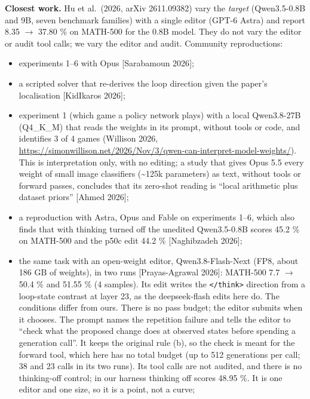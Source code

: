 \documentclass[
  10pt,
]{article}
\newcommand{\passthrough}[1]{#1}
\providecommand{\tightlist}{%
  \setlength{\itemsep}{0pt}\setlength{\parskip}{0pt}}
\begin{document}
\textbf{Closest work.} Hu et al.~(2026, arXiv 2611.09382) vary the
\emph{target} (Qwen3.5-0.8B and 9B, seven benchmark families) with a
single editor (GPT-6 Astra) and report 8.35 \ensuremath{\rightarrow} 37.80 \% on MATH-500 for
the 0.8B model. They do not vary the editor or audit tool calls; we vary
the editor and audit. Community reproductions:

\begin{itemize}
\tightlist
\item
  experiments 1--6 with Opus {[}Sarabamoun 2026{]};
\item
  a scripted solver that re-derives the loop direction given the paper's
  localisation {[}KidIkaros 2026{]};
\item
  experiment 1 (which game a policy network plays) with a local
  Qwen3.8-27B (Q4\_K\_M) that reads the weights in its prompt, without
  tools or code, and identifies 3 of 4 games (Willison 2026,
  \url{https://simonwillison.net/2026/Nov/3/qwen-can-interpret-model-weights/}).
  This is interpretation only, with no editing; a study that gives Opus
  5.5 every weight of small image classifiers (\textasciitilde125k
  parameters) as text, without tools or forward passes, concludes that
  its zero-shot reading is ``local arithmetic plus dataset priors''
  {[}Ahmed 2026{]};
\item
  a reproduction with Astra, Opus and Fable on experiments 1--6, which
  also finds that with thinking turned off the unedited Qwen3.5-0.8B
  scores 45.2 \% on MATH-500 and the p50c edit 44.2 \% {[}Naghibzadeh
  2026{]};
\item
  the same task with an open-weight editor, Qwen3.8-Flash-Next (FP8,
  about 186 GB of weights), in two runs {[}Prayas-Agrawal 2026{]}:
  MATH-500 7.7 \ensuremath{\rightarrow} 50.4 \% and 51.55 \% (4 samples). Its edit writes the
  \passthrough{\lstinline!</think>!} direction from a loop-state
  contrast at layer 23, as the deepseek-flash edits here do. The
  conditions differ from ours. There is no pass budget; the editor
  submits when it chooses. The prompt names the repetition failure and
  tells the editor to ``check what the proposed change does at observed
  states before spending a generation call''. It keeps the original rule
  (b), so the check is meant for the forward tool, which here has no
  total budget (up to 512 generations per call; 38 and 23 calls in its
  two runs). Its tool calls are not audited, and there is no
  thinking-off control; in our harness thinking off scores 48.95 \%. It
  is one editor and one size, so it is a point, not a curve;

\end{itemize}
\end{document}
